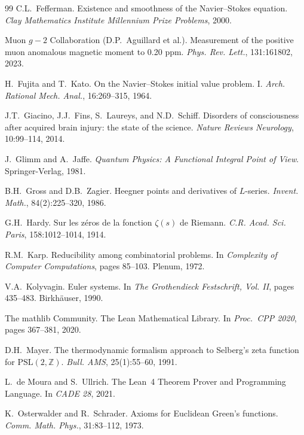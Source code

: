 \documentclass[11pt,a4paper]{amsart}
\theoremstyle{plain}
\theoremstyle{definition}
\begin{document}
\begin{thebibliography}{99}
C.L.~Fefferman.
\newblock Existence and smoothness of the Navier--Stokes equation.
\newblock \emph{Clay Mathematics Institute Millennium Prize Problems}, 2000.

Muon $g-2$ Collaboration (D.P.~Aguillard et al.).
\newblock Measurement of the positive muon anomalous magnetic moment to 0.20 ppm.
\newblock \emph{Phys. Rev. Lett.}, 131:161802, 2023.

H.~Fujita and T.~Kato.
\newblock On the Navier--Stokes initial value problem. I.
\newblock \emph{Arch. Rational Mech. Anal.}, 16:269--315, 1964.

J.T.~Giacino, J.J.~Fins, S.~Laureys, and N.D.~Schiff.
\newblock Disorders of consciousness after acquired brain injury: the state of the science.
\newblock \emph{Nature Reviews Neurology}, 10:99--114, 2014.

J.~Glimm and A.~Jaffe.
\newblock \emph{Quantum Physics: A Functional Integral Point of View}.
\newblock Springer-Verlag, 1981.

B.H.~Gross and D.B.~Zagier.
\newblock Heegner points and derivatives of $L$-series.
\newblock \emph{Invent. Math.}, 84(2):225--320, 1986.

G.H.~Hardy.
\newblock Sur les z\'eros de la fonction $\zeta(s)$ de Riemann.
\newblock \emph{C.R. Acad. Sci. Paris}, 158:1012--1014, 1914.

R.M.~Karp.
\newblock Reducibility among combinatorial problems.
\newblock In \emph{Complexity of Computer Computations}, pages 85--103. Plenum, 1972.

V.A.~Kolyvagin.
\newblock Euler systems.
\newblock In \emph{The Grothendieck Festschrift, Vol. II}, pages 435--483. Birkh\"auser, 1990.

The mathlib Community.
\newblock The Lean Mathematical Library.
\newblock In \emph{Proc.\ CPP 2020}, pages 367--381, 2020.

D.H.~Mayer.
\newblock The thermodynamic formalism approach to Selberg's zeta function for $\mathrm{PSL}(2,\mathbb{Z})$.
\newblock \emph{Bull. AMS}, 25(1):55--60, 1991.

L.~de Moura and S.~Ullrich.
\newblock The Lean~4 Theorem Prover and Programming Language.
\newblock In \emph{CADE 28}, 2021.

K.~Osterwalder and R.~Schrader.
\newblock Axioms for Euclidean Green's functions.
\newblock \emph{Comm. Math. Phys.}, 31:83--112, 1973.


\end{thebibliography}
\end{document}
